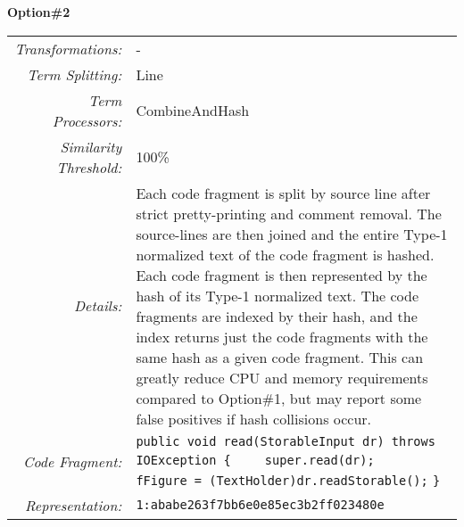 \documentclass[]{article}
\begin{document}
	\noindent \textbf{Option\#2}\\
	\begin{tabular}{rp{12.5cm}}
		\bottomrule[2pt]
		\textit{Transformations:} & - \\
		\textit{Term Splitting:}  & Line\\
		\textit{Term Processors:} & CombineAndHash \\
		\textit{Similarity Threshold:} & 100\% \\
		\midrule
		\textit{Details:}         & Each code fragment is split by source line after strict pretty-printing and comment removal.  The source-lines are then joined and the entire Type-1 normalized text of the code fragment is hashed.  Each code fragment is then represented by the hash of its Type-1 normalized text.  The code fragments are indexed by their hash, and the index returns just the code fragments with the same hash as a given code fragment.  This can greatly reduce CPU and memory requirements compared to Option\#1, but may report some false positives if hash collisions occur.\\
		\textit{Code Fragment:} & \verb|public void read(StorableInput dr) throws IOException {|\newline
		\verb|    super.read(dr);|\newline
		\verb|    fFigure = (TextHolder)dr.readStorable();|\newline
		\verb|}|\\
		\textit{Representation:} & \verb|1:ababe263f7bb6e0e85ec3b2ff023480e|\\
		\bottomrule[2pt]
	\end{tabular} \\\\
	
\end{document}
